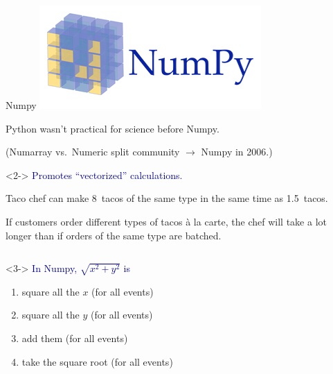 \documentclass[aspectratio=169]{beamer}
\begin{document}
\begin{frame}{Numpy}
\vspace{0.5 cm}
\hfill \includegraphics[height=1.3 cm]{numpy-logo.png}

\vspace{-1.3 cm}
Python wasn't practical for science before Numpy.

(Numarray vs.\ Numeric split community $\to$ Numpy in 2006.)

\vspace{0.35 cm}
\begin{uncoverenv}<2->
\textcolor{darkblue}{Promotes ``vectorized'' calculations.}

\begin{center}
\begin{minipage}{0.85\linewidth}
Taco chef can make 8~tacos of the same type in the same time as 1.5~tacos.

\vspace{0.2 cm}
If customers order different types of tacos \`a la carte, the chef will take a lot longer than if orders of the same type are batched.
\end{minipage}
\end{center}
\end{uncoverenv}

\vspace{0.15 cm}
\begin{columns}[t]
\begin{uncoverenv}<3->
\textcolor{darkblue}{In Numpy, $\sqrt{x^2 + y^2}$ is}
\begin{enumerate}
\item square all the $x$ (for all events)
\item square all the $y$ (for all events)
\item add them (for all events)
\item take the square root (for all events)
\end{enumerate}
\end{uncoverenv}


\vspace{0.15 cm}
\end{columns}
\end{frame}
\end{document}
